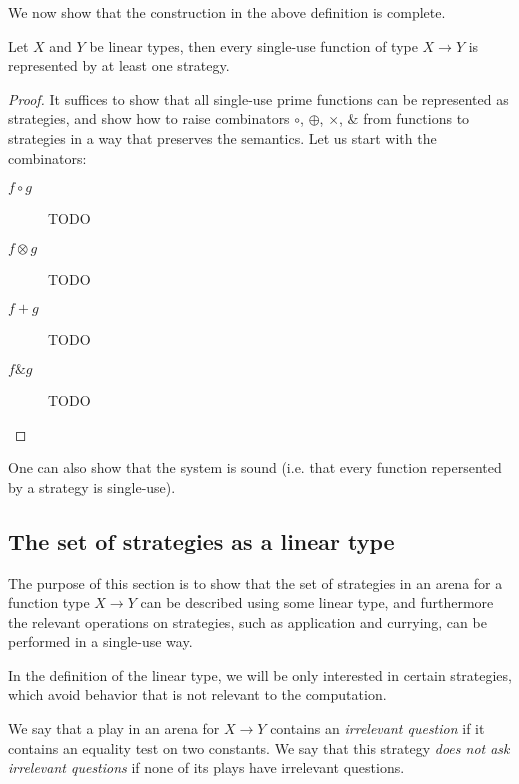We now show that the construction in the above definition is complete.
\begin{lemma}
    Let $X$ and $Y$ be linear types, then every single-use function of type $X \to Y$ is represented by at least one strategy. 
\end{lemma}
\begin{proof}
    It suffices to show that all single-use prime functions can be represented as strategies,
    and show how to raise combinators $\circ$, $\oplus$, $\times$, $\&$ from functions to 
    strategies in a way that preserves the semantics. Let us start with the combinators:
    \begin{description}
        \item[$f \circ g$] TODO
        \item[$f \otimes g$] TODO
        \item[$f + g$] TODO 
        \item[$f \& g$] TODO
    \end{description}
\end{proof}
One can also show that the system is sound (i.e. that every function repersented by a strategy is single-use). 

\subsection{The set of strategies as a linear type}
The purpose of this section is to show that the set of strategies in an arena for a function type $X \to Y$ can be described using some linear type, and furthermore the relevant operations on strategies, such as application and currying, can be performed in a single-use way. 

In the definition of the linear type, we will be only interested in certain strategies, which avoid behavior that is not relevant to the computation.

\begin{definition} We say that a play in an arena for $X \to Y$ contains an \emph{irrelevant question} if it contains an equality test on two constants. We say that this strategy \emph{does not ask irrelevant questions} if none of its plays have irrelevant questions.
\end{definition}
  
